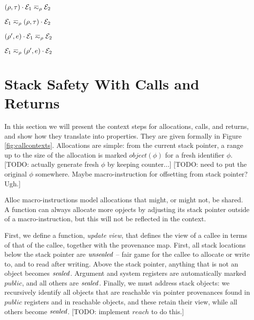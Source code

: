 \documentclass[10pt,conference]{ieeetran}%
\theoremstyle{definition}
\begin{document}
\begin{minipage}{.4\columnwidth}
           {\((\rho,\tau) \cdot \mathcal{E}_1 \eqsim_\rho \mathcal{E}_2\)}
\end{minipage}
\begin{minipage}{.4\columnwidth}
           {\(\mathcal{E}_1 \eqsim_\rho (\rho,\tau) \cdot \mathcal{E}_2\)}
\end{minipage}

\begin{minipage}{.4\columnwidth}
           {\((\rho',e) \cdot \mathcal{E}_1 \eqsim_\rho \mathcal{E}_2\)}
\end{minipage}
\begin{minipage}{.4\columnwidth}
           {\(\mathcal{E}_1 \eqsim_\rho (\rho',e) \cdot \mathcal{E}_2\)}
\end{minipage}

\section{Stack Safety With Calls and Returns}

In this section we will present the context steps for allocations,
calls, and returns, and show how they
translate into properties. They are given formally in Figure \ref{fig:callcontexts}.
Allocations are simple: from the current stack pointer, a range up to the size of
the allocation is marked \(\mathit{object}(\phi)\) for a fresh identifier \(\phi\).
[TODO: actually generate fresh \(\phi\) by keeping counter...]
[TODO: need to put the original \(\phi\) somewhere. Maybe macro-instruction
  for offsetting from stack pointer? Ugh.]

Alloc macro-instructions model allocations that might, or might not, be
shared. A function can always allocate more opjects by adjusting its
stack pointer outside of a macro-instruction, but this will not be reflected
in the context.

First, we define a function, {\it update view}, that defines the view of a callee
in terms of that of the callee, together with the provenance map.
First, all stack locations below the stack pointer
are \(\mathit{unsealed}\) -- fair game for the callee to allocate or write to, and
to read after writing. Above the stack pointer, anything that is not an object
becomes \(\mathit{sealed}\). Argument and system registers are automatically marked
\(\mathit{public}\), and all others are \(\mathit{sealed}\).
Finally, we must address stack objects: we recursively identify all objects
that are reachable via pointer provenances found in \(\mathit{public}\)
registers and in reachable objects, and these retain their view, while
all others become \(\mathit{sealed}\). [TODO: implement \(\mathit{reach}\) to do this.]
\end{document}
